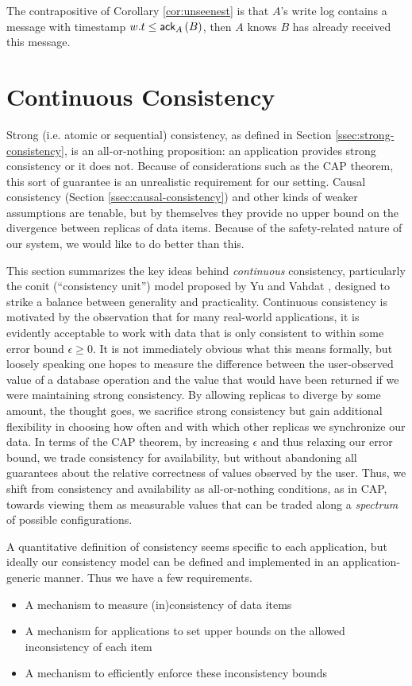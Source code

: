 \documentclass[]             %
{NASA}                       %
\theoremstyle{definition}
\providecommand{\tightlist}{%
  \setlength{\itemsep}{0pt}\setlength{\parskip}{0pt}}
\begin{document}
The contrapositive of Corollary \ref{cor:unseenest} is that $A$'s
write log contains a message with timestamp $w.t \leq \textsf{ack}_{A}\left(B\right)$,
then $A$ knows $B$ has already received this message.


\section{Continuous Consistency}
\label{sec:continuous-consistency}
Strong (i.e. atomic or sequential) consistency, as defined in Section
\ref{ssec:strong-consistency}, is an all-or-nothing proposition: an
application provides strong consistency or it does not. Because of
considerations such as the CAP theorem, this sort of guarantee is an
unrealistic requirement for our setting. Causal consistency (Section
\ref{ssec:causal-consistency}) and other kinds of weaker assumptions
are tenable, but by themselves they provide no upper bound on the
divergence between replicas of data items. Because of the
safety-related nature of our system, we would like to do better than
this.

This section summarizes the key ideas behind \emph{continuous}
consistency, particularly the conit (``consistency unit'') model
proposed by Yu and Vahdat
\cite{2000tact,2000tactalgorithms,10.5555/1251229.1251250,DBLP:conf/icdcs/YuV01,2002tact},
designed to strike a balance between generality and
practicality. Continuous consistency is motivated by the observation
that for many real-world applications, it is evidently acceptable to
work with data that is only consistent to within some error bound
$\epsilon \geq 0$. It is not immediately obvious what this means
formally, but loosely speaking one hopes to measure the difference
between the user-observed value of a database operation and the value
that would have been returned if we were maintaining strong
consistency. By allowing replicas to diverge by some amount, the
thought goes, we sacrifice strong consistency but gain additional
flexibility in choosing how often and with which other replicas we
synchronize our data. In terms of the CAP theorem, by increasing
$\epsilon$ and thus relaxing our error bound, we trade consistency for
availability, but without abandoning all guarantees about the relative
correctness of values observed by the user. Thus, we shift from
consistency and availability as all-or-nothing conditions, as in CAP,
towards viewing them as measurable values that can be traded along a
\emph{spectrum} of possible configurations.

A quantitative definition of consistency seems specific to each
application, but ideally our consistency model can be defined and
implemented in an application-generic manner. Thus we have a few
requirements.
\begin{itemize}
  \tightlist
\item A mechanism to measure (in)consistency of data items
\item A mechanism for applications to set upper bounds on the allowed
  inconsistency of each item
\item A mechanism to efficiently enforce these inconsistency bounds
\end{itemize}
\end{document}
